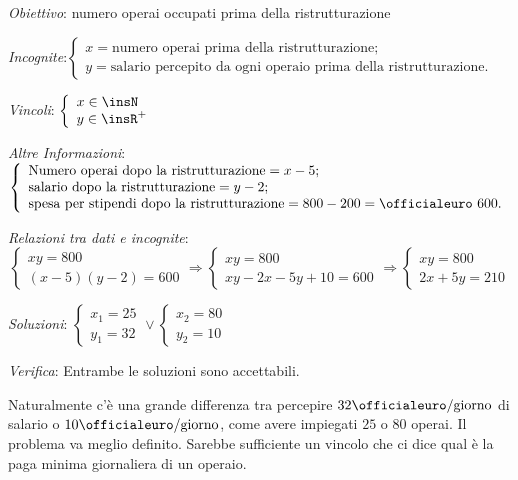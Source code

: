 \emph{Obiettivo}: numero operai occupati prima della ristrutturazione

\emph{Incognite}:$ \left\{\begin{array}{l}
x =\text{numero operai prima della ristrutturazione};\\
y= \text{salario percepito da ogni operaio prima della ristrutturazione}.
\end{array}\right.$

\emph{Vincoli}: $\left\{\begin{array}{l}x\in \insN\\y\in \insR^+\end{array}\right.$

\emph{Altre Informazioni}: $ \left\{\begin{array}{l}
\text{Numero operai dopo la ristrutturazione} = x-5;\\
\text{salario dopo la ristrutturazione} =y-2;\\
\text{spesa per stipendi dopo la ristrutturazione} =800-200=\text{\officialeuro~}600.\end{array}\right.$

\emph{Relazioni tra dati e incognite}:
\begin{equation*}
\left\{\begin{array}{l}{{xy}=800}\\{(x-5)(y-2)=600}\end{array}\right.\Rightarrow \left\{\begin{array}{l}{{xy}=800}\\{{xy}-2x-5y+10=600}\end{array}\right.\Rightarrow \left\{\begin{array}{l}{{xy}=800}\\{2x+5y=210}\end{array}\right.
\end{equation*}

\emph{Soluzioni}: $\left\{\begin{array}{l}{x_1=25}\\{y_1=32}\end{array}\right.\vee \left\{\begin{array}{l}{x_2=80}\\{y_2=10}\end{array}\right.$

\emph{Verifica}: Entrambe le soluzioni sono accettabili.

Naturalmente c'è una grande differenza tra percepire $32\unit{\text{\officialeuro/giorno}}$ di salario o $ 10\unit{\text{\officialeuro/giorno}}$, come avere impiegati $25$ o $80$ operai. Il problema va meglio definito. Sarebbe sufficiente un vincolo che ci dice qual è la paga minima giornaliera di un operaio.

